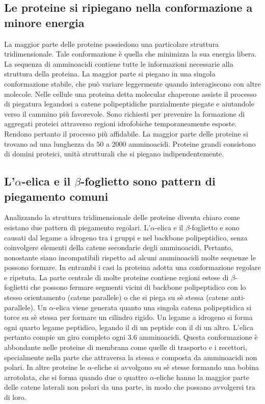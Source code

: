 \subsection{Le proteine si ripiegano nella conformazione a minore energia}
La maggior parte delle proteine possiedono una particolare struttura tridimensionale. Tale conformazione \`e quella che minimizza la sua energia libera. 
La sequenza di amminoacidi contiene tutte le informazioni necessarie alla struttura della proteina. La maggior parte si piegano in una singola 
conformazione stabile, che pu\`o variare leggermente quando interagiscono con altre molecole. Nelle cellule una proteina detta molecular chaperone assiste
il processo di piegatura legandosi a catene polipeptidiche parzialmente piegate e aiutandole verso il cammino pi\`u favorevole. Sono richiesti per 
prevenire la formazione di aggregati proteici attraverso regioni idrofobiche temporaneamente esposte. Rendono pertanto il processo pi\`u affidabile. La
maggior parte delle proteine si trovano ad una lunghezza da $50$ a $2000$ amminoacidi. Proteine grandi consistono di domini proteici, unit\`a strutturali 
che si piegano indipendentemente. 
\subsection{L'$\alpha$-elica e il $\beta$-foglietto sono pattern di piegamento comuni}
Analizzando la struttura tridimensionale delle proteine diventa chiaro come esistano due pattern di piegamento regolari. L'$\alpha$-elica e il 
$\beta$-foglietto e sono causati dal legame a idrogeno tra i gruppi  e  nel backbone polipeptidico, senza coinvolgere elementi della 
catene secondarie degli amminoacidi. Pertanto, nonostante siano incompatibili rispetto ad alcuni amminoacidi molte sequenze le possono formare. In 
entrambi i casi la proteina adotta una conformazione regolare e ripetuta. La parte centrale di molte proteine contiene regioni estese di 
$\beta$-foglietti che possono fermare segmenti vicini di backbone polipeptidico con lo stesso orientamento (catene parallele) o che si piega su s\`e 
stessa (catene anti-parallele). Un $\alpha$-elica viene generata quanto una singola catena polipeptidica si torce su s\`e stessa per formare un cilindro
rigido. Un legame a idrogeno si forma ogni quarto legame peptidico, legando il  di un peptide con il  di un altro. L'elica pertanto
compie un giro completo ogni $3.6$ amminoacidi. Questa conformazione \`e abbondante nelle proteine di membrana come quelle di trasporto e i recettori, 
specialmente nella parte che attraversa la stessa e composta da amminoacidi non polari. In altre proteine le $\alpha$-eliche si avvolgono su s\`e stesse
formando una bobina arrotolata, che si forma quando due o quattro $\alpha$-eliche hanno la maggior parte delle catene laterali non polari da una parte, in
modo che possano avvolgersi tra di loro. 
